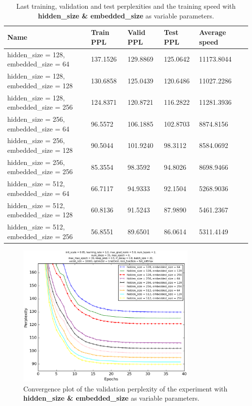 \documentclass[10pt,a4paper,titlepage]{article}
\begin{document}
\begin{table}[H]
\centering
\caption{Last training, validation and test perplexities and the training speed with \textbf{hidden\_size \& embedded\_size} as variable parameters.}
\label{tab:exp3data}
\begin{tabular}{|l|l|l|l|l|l|}
\hline
{\small Name} & {\small Train PPL} & {\small Valid PPL} & {\small Test PPL} & {\small Average speed}\\ \hline
{\small hidden\_size = 128, embedded\_size = 64  }       & 137.1526   & 129.8869   & 125.0642   & 11173.8044 \\ \hline
{\small hidden\_size = 128, embedded\_size = 128}        & 130.6858   & 125.0439   & 120.6486   & 11027.2286 \\ \hline
{\small hidden\_size = 128, embedded\_size = 256}        & 124.8371   & 120.8721   & 116.2822   & 11281.3936 \\ \hline
{\small hidden\_size = 256, embedded\_size = 64}         & 96.5572    & 106.1885   & 102.8703   & 8874.8156  \\ \hline
{\small hidden\_size = 256, embedded\_size = 128}        & 90.5044    & 101.9240   & 98.3112    & 8584.0692  \\ \hline
{\small hidden\_size = 256, embedded\_size = 256}        & 85.3554    & 98.3592    & 94.8026    & 8698.9466  \\ \hline
{\small hidden\_size = 512, embedded\_size = 64}         & 66.7117    & 94.9333    & 92.1504    & 5268.9036  \\ \hline
{\small hidden\_size = 512, embedded\_size = 128}        & 60.8136    & 91.5243    & 87.9890    & 5461.2367  \\ \hline
{\small hidden\_size = 512, embedded\_size = 256}        & 56.8551    & 89.6501    & 86.0614    & 5311.4149  \\ \hline
\end{tabular}
\end{table}

\begin{figure}[H]
	\begin{center}
		\includegraphics[width=0.80\textwidth]{Figures/hiddenembeddedperf.eps}
		\caption{Convergence plot of the validation perplexity of the experiment with \textbf{hidden\_size \& embedded\_size} as variable parameters.}
		\label{fig:exp3perf}
	\end{center}	
\end{figure}
\end{document}
